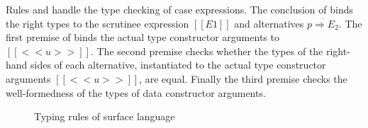 Rules  and  handle the type checking of case expressions. The conclusion of  binds the right types to the scrutinee expression $[[E1]]$ and alternatives $\overline{p \Rightarrow E_2}$. The first premise of  binds the actual type constructor arguments to $[[<<u>>]]$. The second premise checks whether the types of the right-hand sides of each alternative, instantiated to the actual type constructor arguments $[[<<u>>]]$, are equal. Finally the third premise checks the well-formedness of the types of data constructor arguments.

\begin{figure*}
\ottdefnctxsrc{}
\ottdefnpgmsrc{}
\ottdefndeclsrc{}
\ottdefnpatsrc{}
\ottdefnexprsrc{}
\caption{Typing rules of surface language}
\label{fig:surface:typing}
\end{figure*}


